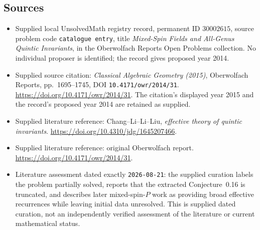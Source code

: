 \documentclass[11pt]{article}
\begin{document}
\subsection{Sources}
\begin{itemize}
\item Supplied local UnsolvedMath registry record, permanent ID \(30002615\), source problem code \texttt{catalogue entry}, title \emph{Mixed-Spin Fields and All-Genus Quintic Invariants}, in the Oberwolfach Reports Open Problems collection. No individual proposer is identified; the record gives proposed year 2014.
\item Supplied source citation: \emph{Classical Algebraic Geometry (2015)}, Oberwolfach Reports, pp.~1695--1745, DOI \texttt{10.4171/owr/2014/31}. \url{https://doi.org/10.4171/owr/2014/31}. The citation's displayed year 2015 and the record's proposed year 2014 are retained as supplied.
\item Supplied literature reference: Chang--Li--Li--Liu, \emph{effective theory of quintic invariants}. \url{https://doi.org/10.4310/jdg/1645207466}.
\item Supplied literature reference: original Oberwolfach report. \url{https://doi.org/10.4171/owr/2014/31}.
\item Literature assessment dated exactly \texttt{2026-08-21}: the supplied curation labels the problem partially solved, reports that the extracted Conjecture~0.16 is truncated, and describes later mixed-spin-\(P\) work as providing broad effective recurrences while leaving initial data unresolved. This is supplied dated curation, not an independently verified assessment of the literature or current mathematical status.
\end{itemize}
\end{document}
